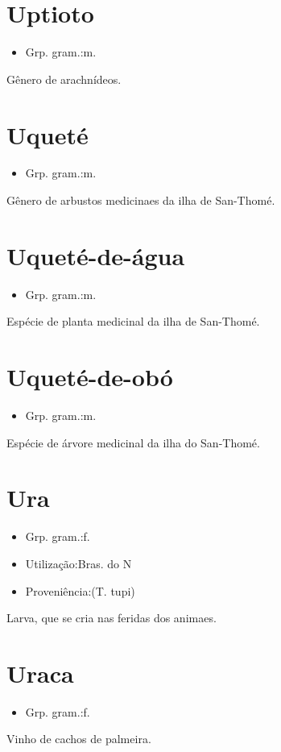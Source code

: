 \documentclass{article}
\begin{document}
\section{Uptioto}
\begin{itemize}
\item {Grp. gram.:m.}
\end{itemize}
Gênero de arachnídeos.
\section{Uqueté}
\begin{itemize}
\item {Grp. gram.:m.}
\end{itemize}
Gênero de arbustos medicinaes da ilha de San-Thomé.
\section{Uqueté-de-água}
\begin{itemize}
\item {Grp. gram.:m.}
\end{itemize}
Espécie de planta medicinal da ilha de San-Thomé.
\section{Uqueté-de-obó}
\begin{itemize}
\item {Grp. gram.:m.}
\end{itemize}
Espécie de árvore medicinal da ilha do San-Thomé.
\section{Ura}
\begin{itemize}
\item {Grp. gram.:f.}
\end{itemize}
\begin{itemize}
\item {Utilização:Bras. do N}
\end{itemize}
\begin{itemize}
\item {Proveniência:(T. tupi)}
\end{itemize}
Larva, que se cria nas feridas dos animaes.
\section{Uraca}
\begin{itemize}
\item {Grp. gram.:f.}
\end{itemize}
Vinho de cachos de palmeira.
\end{document}
